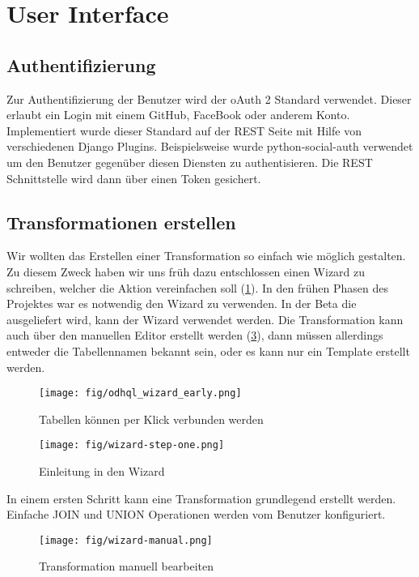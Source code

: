 

\section{User Interface}
\subsection{Authentifizierung}
Zur Authentifizierung der Benutzer wird der oAuth 2 Standard verwendet. Dieser erlaubt ein Login mit einem GitHub, FaceBook oder anderem Konto. Implementiert wurde dieser Standard auf der REST Seite mit Hilfe von verschiedenen Django Plugins. 
Beispielsweise wurde python-social-auth verwendet um den Benutzer gegenüber diesen Diensten zu authentisieren. Die REST Schnittstelle wird dann über einen Token gesichert.

\subsection{Transformationen erstellen}
Wir wollten das Erstellen einer Transformation so einfach wie möglich gestalten. Zu diesem Zweck haben wir uns früh dazu entschlossen einen Wizard zu schreiben, welcher die Aktion vereinfachen soll (\cref{fig:pd:tables_per_click}). In den frühen Phasen des Projektes war es notwendig den Wizard zu verwenden. In der Beta die ausgeliefert wird, kann der Wizard verwendet werden. Die Transformation kann auch über den manuellen Editor erstellt werden (\cref{fig:pd:wizard-manual}), dann müssen allerdings entweder die Tabellennamen bekannt sein, oder es kann nur ein Template erstellt werden.
\begin{figure}[H]
\centering
\texttt{[image: fig/odhql\_wizard\_early.png]}
\caption{Tabellen können per Klick verbunden werden }
\label{fig:pd:tables_per_click}
\end{figure}
\begin{figure}[H]
\centering
\texttt{[image: fig/wizard-step-one.png]}
\caption{Einleitung in den Wizard}
\label{fig:pd:wizard-step-one}
\end{figure}
In einem ersten Schritt kann eine Transformation grundlegend erstellt werden. Einfache JOIN und UNION Operationen werden vom Benutzer konfiguriert.
\begin{figure}[H]
\centering
\texttt{[image: fig/wizard-manual.png]}
\caption{Transformation manuell bearbeiten}
\label{fig:pd:wizard-manual}
\end{figure}

